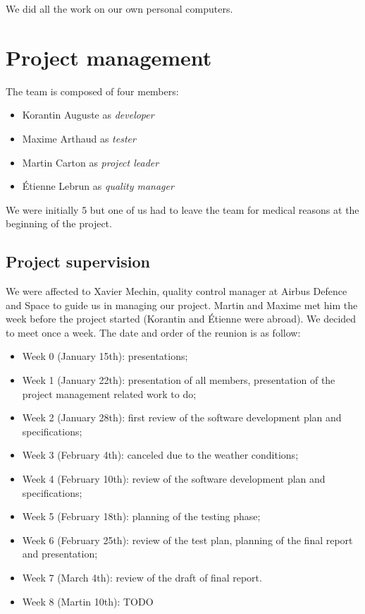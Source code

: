 \documentclass[openany, a4paper]{book}
\begin{document}
      We did all the work on our own personal computers.


  \chapter{Project management}
    The team is composed of four members:
    \begin{itemize}
      \item Korantin Auguste as \textit{developer}
      \item Maxime Arthaud as \textit{tester}
      \item Martin Carton as \textit{project leader}
      \item Étienne Lebrun as \textit{quality manager}
    \end{itemize}

    We were initially 5 but one of us had to leave the team for medical reasons
    at the beginning of the project.

    \section{Project supervision}
      We were affected to Xavier Mechin, quality control manager at Airbus
      Defence and Space to guide us in managing our project. Martin and Maxime
      met him the week before the project started (Korantin and Étienne were
      abroad). We decided to meet once a week. The date and order of the reunion
      is as follow:

      \begin{itemize}
        \item Week 0 (January 15th): presentations;
        \item Week 1 (January 22th): presentation of all members, presentation
          of the project management related work to do;
        \item Week 2 (January 28th): first review of the software development
          plan and specifications;
        \item Week 3 (February 4th): canceled due to the weather conditions;
        \item Week 4 (February 10th): review of the software development plan
          and specifications;
        \item Week 5 (February 18th): planning of the testing phase;
        \item Week 6 (February 25th): review of the test plan, planning of the
          final report and presentation;
        \item Week 7 (March 4th): review of the draft of final report.
        \item Week 8 (Martin 10th): TODO
      \end{itemize}
\end{document}
